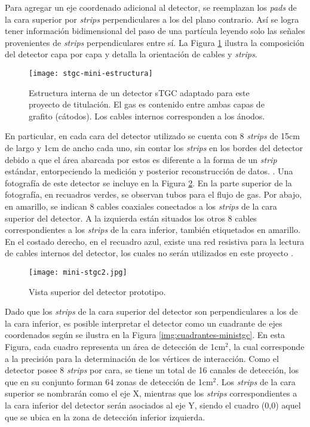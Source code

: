 	Para agregar un eje coordenado adicional al detector, se reemplazan los \textit{pads} de la cara superior por \textit{strips} perpendiculares a los del plano contrario. Así se logra tener información bidimensional del paso de una partícula leyendo solo las señales provenientes de \textit{strips} perpendiculares entre sí. La Figura \ref{img:stgc-mini-estructura} ilustra la composición del detector capa por capa y detalla la orientación de cables y \textit{strips}.
	
	\begin{figure}[h]
		\centering
		\texttt{[image: stgc-mini-estructura]}
		\caption{Estructura interna de un detector sTGC adaptado para este proyecto de titulación. El gas es contenido entre ambas capas de grafito (cátodos). Los cables internos corresponden a los ánodos.}
		\label{img:stgc-mini-estructura}
	\end{figure}

	En particular, en cada cara del detector utilizado se cuenta con 8 \textit{strips} de 15cm de largo y 1cm de ancho cada uno, sin contar los \textit{strips} en los bordes del detector debido a que el área abarcada por estos es diferente a la forma de un \textit{strip} estándar, entorpeciendo la medición y posterior reconstrucción de datos. . Una fotografía de este detector se incluye en la Figura \ref{img:foto-mini-stgc}. En la parte superior de la fotografía, en recuadros verdes, se observan tubos para el flujo de gas. Por abajo, en amarillo, se indican 8 cables coaxiales conectados a los \textit{strips} de la cara superior del detector. A la izquierda están situados los otros 8 cables correspondientes a los \textit{strips} de la cara inferior, también etiquetados en amarillo. En el costado derecho, en el recuadro azul, existe una red resistiva para la lectura de cables internos del detector, los cuales no serán utilizados en este proyecto .
	
	\begin{figure}[h]
		\centering
		\texttt{[image: mini-stgc2.jpg]}
		\caption{Vista superior del detector prototipo.}
		\label{img:foto-mini-stgc}
	\end{figure}	
	
	Dado que los \textit{strips} de la cara superior del detector son perpendiculares a los de la cara inferior, es posible interpretar el detector como un cuadrante de ejes coordenados según se ilustra en la Figura \ref{img:cuadrantes-ministgc}. En esta Figura, cada cuadro representa un área de detección de 1cm$^2$, la cual corresponde a la precisión para la determinación de los vértices de interacción. Como el detector posee 8 \textit{strips} por cara, se tiene un total de 16 canales de detección, los que en su conjunto forman 64 zonas de detección de 1cm$^2$. Los \textit{strips} de la cara superior se nombrarán como el eje X, mientras que los \textit{strips} correspondientes a la cara inferior del detector serán asociados al eje Y, siendo el cuadro (0,0) aquel que se ubica en la zona de detección inferior izquierda.
	
